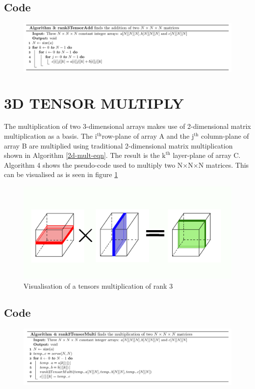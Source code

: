 \subsection{Code}
\begin{figure}[H]
\includegraphics[width=\textwidth]{build/Algo3.png}
\end{figure}
\section{3D TENSOR MULTIPLY}
The multiplication of two 3-dimensional arrays makes use of 2-dimensional matrix multiplication as a basis. The $\text{i}^\text{th}$row-plane of array A and the $\text{j}^\text{th}$ column-plane of array B are multiplied using traditional 2-dimensional matrix multiplication shown in Algorithm \ref{2d-mult-eqn}. The result is the $\text{k}^\text{th}$ layer-plane of array C. Algorithm 4 shows the pseudo-code used to multiply two N$\times$N$\times$N matrices. This can be visualised as is seen in figure \ref{3D}
\begin{figure}
\centering
\includegraphics[scale=0.5]{build/3Dmult.png}
\caption{Visualisation of a tensors multiplication of rank 3}
\label{3D}
\end{figure}
\subsection{Code}
\begin{figure}[H]
\includegraphics[width=\textwidth]{build/Algo4.png}
\end{figure}
